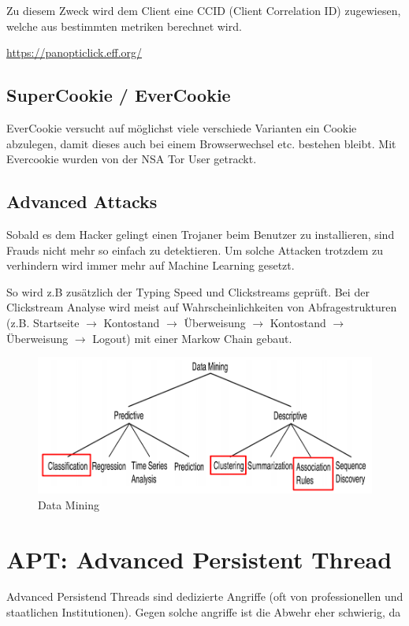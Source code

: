 Zu diesem Zweck wird dem Client eine CCID (Client Correlation ID) zugewiesen, welche aus bestimmten metriken berechnet wird.

\url{https://panopticlick.eff.org/}

\subsection{SuperCookie / EverCookie}
EverCookie versucht auf möglichst viele verschiede Varianten ein Cookie abzulegen, damit dieses auch bei einem Browserwechsel etc. bestehen bleibt. Mit Evercookie wurden von der NSA Tor User getrackt.

\subsection{Advanced Attacks}
Sobald es dem Hacker gelingt einen Trojaner beim Benutzer zu installieren, sind Frauds nicht mehr so einfach zu detektieren. Um solche Attacken trotzdem zu verhindern wird immer mehr auf Machine Learning gesetzt.

So wird z.B zusätzlich der Typing Speed und Clickstreams geprüft. Bei der Clickstream Analyse wird meist auf Wahrscheinlichkeiten von Abfragestrukturen (z.B. Startseite $\rightarrow$ Kontostand $\rightarrow$ Überweisung $\rightarrow$ Kontostand $\rightarrow$ Überweisung $\rightarrow$ Logout) mit einer Markow Chain gebaut.

\begin{figure}[h]
	\centering
	\includegraphics[width=0.7\linewidth]{images/data_mining}
	\caption{Data Mining}
	\label{fig:datamining}
\end{figure}

\section{APT: Advanced Persistent Thread}

Advanced Persistend Threads sind dedizierte Angriffe (oft von professionellen und staatlichen Institutionen). Gegen solche angriffe ist die Abwehr eher schwierig, da

